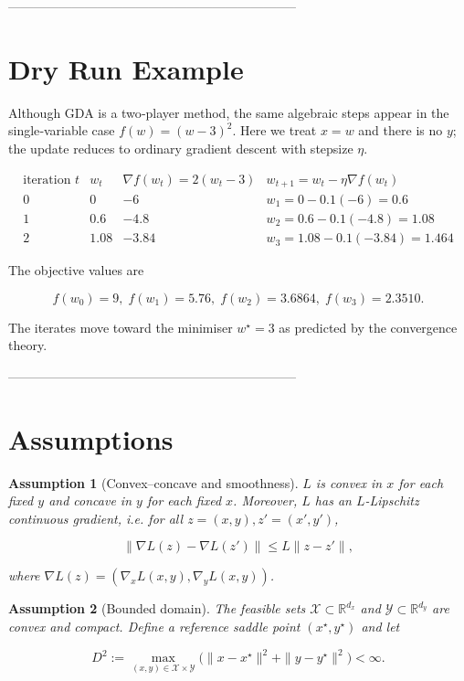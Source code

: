 \documentclass{article}
\newtheorem{assumption}{Assumption}
\begin{document}
--------------------------------------------------------------------

\section*{Dry Run Example}
Although GDA is a two‑player method, the same algebraic steps appear in the single‑variable case
\(f(w)=(w-3)^2\).  Here we treat \(x=w\) and there is no \(y\); the update reduces to ordinary
gradient descent with stepsize \(\eta\).

\[
\begin{array}{c|c|c|c}
\text{iteration }t & w_t & \nabla f(w_t)=2(w_t-3) & w_{t+1}=w_t-\eta\nabla f(w_t)\\ \hline
0 & 0 & -6 & w_1=0-0.1(-6)=0.6\\
1 & 0.6 & -4.8 & w_2=0.6-0.1(-4.8)=1.08\\
2 & 1.08 & -3.84 & w_3=1.08-0.1(-3.84)=1.464
\end{array}
\]

The objective values are  

\[
f(w_0)=9,\; f(w_1)=5.76,\; f(w_2)=3.6864,\; f(w_3)=2.3510.
\]

The iterates move toward the minimiser \(w^\star=3\) as predicted by the convergence theory.

--------------------------------------------------------------------

\section*{Assumptions}
\begin{assumption}[Convex–concave and smoothness]\label{ass:convexconcave}
\(L\) is convex in \(x\) for each fixed \(y\) and concave in \(y\) for each fixed \(x\).  
Moreover, \(L\) has an \(L\)-Lipschitz continuous gradient, i.e. for all
\(z=(x,y),z'=(x',y')\),

\[
\|\nabla L(z)-\nabla L(z')\|\le L\|z-z'\|,
\tag{3}
\]

where \(\nabla L(z)=(\nabla_x L(x,y),\nabla_y L(x,y))\).
\end{assumption}

\begin{assumption}[Bounded domain]\label{ass:bounded}
The feasible sets \(\mathcal{X}\subset\mathbb{R}^{d_x}\) and \(\mathcal{Y}\subset\mathbb{R}^{d_y}\) are convex and compact.
Define a reference saddle point \((x^\star,y^\star)\) and let  

\[
D^2:=\max_{(x,y)\in\mathcal{X}\times\mathcal{Y}}
\bigl(\|x-x^\star\|^2+\|y-y^\star\|^2\bigr)<\infty .
\tag{4}
\]
\end{assumption}
\end{document}
